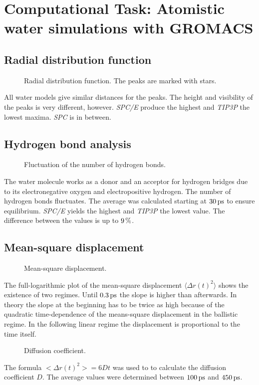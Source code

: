 \documentclass[12pt,a4paper]{scrartcl}
\begin{document}
\section{Computational Task: Atomistic water simulations with GROMACS}

\subsection{Radial distribution function}
\begin{figure}[H]
	\resizebox{\linewidth}{!}{}
    \caption{Radial distribution function. The peaks are marked with stars.} \label{fig:rdf}
\end{figure}

All water models give similar distances for the peaks. The height and visibility of the peaks is very different, however. \textit{SPC/E} produce the highest and \textit{TIP3P} the lowest maxima. \textit{SPC} is in between. 

\subsection{Hydrogen bond analysis}
\begin{figure}[H]
	\resizebox{\linewidth}{!}{}
    \caption{Fluctuation of the number of hydrogen bonds.} \label{fig:hbnum}
\end{figure}

The water molecule works as a donor and an acceptor for hydrogen bridges due to its electronegative oxygen and electropositive hydrogen. The number of hydrogen bonds fluctuates. The average was calculated starting at $\unit[30]{ps}$ to ensure equilibrium. \textit{SPC/E} yields the highest and \textit{TIP3P} the lowest value. The difference between the values is up to $\unit[9]{\%}$.

\subsection{Mean-square displacement}
\begin{figure}[H]
	\resizebox{\linewidth}{!}{}
    \caption{Mean-square displacement.} \label{fig:msd}
\end{figure}

The full-logarithmic plot of the mean-square displacement $\langle \Delta r(t)^2 \rangle$ shows the existence of two regimes. Until $\unit[0.3]{ps}$ the slope is higher than afterwards. In theory the slope at the beginning has to be twice as high because of the quadratic time-dependence of the means-square displacement in the ballistic regime. In the following linear regime the displacement is proportional to the time itself.

\begin{figure}[H]
	\resizebox{\linewidth}{!}{}
    \caption{Diffusion coefficient.} \label{fig:diffusion}
\end{figure}

The formula $< \Delta r(t)^2 > = 6 D t$ was used to to calculate the diffusion coefficient $D$. The average values were determined between $\unit[100]{ps}$ and $\unit[450]{ps}$.
\end{document}

